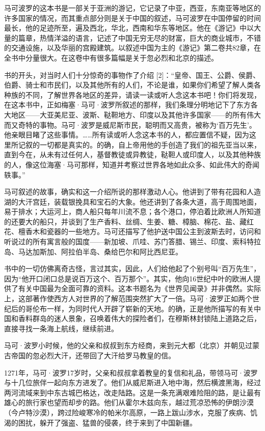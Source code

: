 \documentclass[12pt,UTF8]{ctexbook}
\begin{document}
马可波罗的这本书是一部关于亚洲的游记，它记录了中亚，西亚，东南亚等地区的许多国家的情况，而其重点部分则是关于中国的叙述，马可波罗在中国停留的时间最长，他的足迹所至，遍及西北，华北，西南和华东等地区。他在《游记》中以大量的篇章，热情洋溢的语言，记述了中国无穷无尽的财富，巨大的商业城市，不错的交通设施，以及华丽的宫殿建筑。以叙述中国为主的《游记》第二卷共82章，在全书中分量很大。在这卷中有很多篇幅是关于忽必烈和北京的描述。

书的开头，对当时人们十分惊奇的事物作了介绍 [2]：“皇帝、国王、公爵、侯爵、伯爵、骑士和市民们，以及其他所有的人们，不论是谁，如果你们希望了解人类各种族的不同，了解世界各地区的差异，请读一读或听人念这本书吧！你们将发现，在这本书中，正如梅塞·马可·波罗所叙述的那样，我们条理分明地记下了东方各大地区——大亚美尼亚、波斯、鞑靼地方、印度以及其他许多国家——的所有伟大而又奇特的事物。马可·波罗是威尼斯市民，聪明而又高贵，被称为‘百万先生’。他亲眼目睹了这些事情。……所有读或听人念这本书的人，都应置信不疑，因为这里所记叙的一切都是真实的。的确，自上帝用他的手创造了我们的祖先亚当以来，直到今在，从未有过任何人，基督教徒或异教徒，鞑靼人或印度人，以及其他种族的人，像这位海塞·马可那样，知道并考察过世界各地如此众多、如此伟大的奇闻轶事。”

马可叙述的故事，确实和这一介绍所说的那样激动人心。他讲到了带有花园和人造湖的大汗宫廷，装载银挽具和宝石的大象。他还讲到了各条大道，高于周围地面，易于排水；大运河上，商人船只每年川流不息；各个港口，停泊着比欧洲人所知道的还要大的船只，并谈到了生产香料、丝绸、生姜、糖、樟脑、棉花、盐、藏红花、檀香木和瓷器的一些地方。马可还描写了他护送中国公主到波斯去时，访问和听说过的所有寓言般的国度——新加坡、爪哇、苏门答腊、锡兰、印度、索科特拉岛、马达加斯加、阿拉伯半岛、桑给巴尔和阿比西尼亚。

书中的一切仿佛离奇古怪，言过其实，因此，人们给他起了个别号叫“百万先生”，因为“他开口闭口总是说百万这个、百万那个”。其实，他向16世纪中叶的欧洲人提供了有关中国最为全面可靠的资料。这本书题名为《世界见闻录》并非偶然。实际上，这部著作使西方人对世界的了解范围突然扩大了一倍。马可·波罗正如两个世纪后的哥伦布一样，为同时代人开辟了崭新的天地。的确，正是他所描写的有关中国和香料群岛的迷人景象，召唤着伟大的探险者们，在穆斯林封锁陆上道路之后，直接寻找一条海上航线，继续前进。

马可·波罗小时候，他的父亲和叔叔到东方经商，来到元大都（北京）并朝见过蒙古帝国的忽必烈大汗，还带回了大汗给罗马教皇的信。

1271年，马可·波罗17岁时，父亲和叔叔拿着教皇的复信和礼品，带领马可·波罗与十几位旅伴一起向东方进发了。他们从威尼斯进入地中海，然后横渡黑海，经过两河流域来到中东古城巴格达，改走陆路。这是一条充满艰难险阻的路，是让最有雄心的旅行家也望而却步的路。他们从霍尔木兹向东，越过荒凉恐怖的伊朗沙漠（今卢特沙漠），跨过险峻寒冷的帕米尔高原，一路上跋山涉水，克服了疾病、饥渴的困扰，躲开了强盗、猛兽的侵袭，终于来到了中国新疆。
\end{document}
